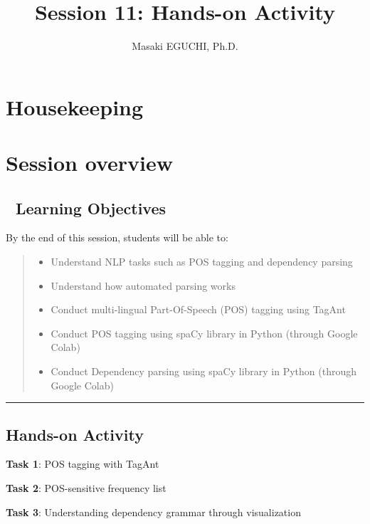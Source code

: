 \documentclass[
  english,
  11pt,
]{article}
\title{Session 11: Hands-on Activity}
\author{Masaki EGUCHI, Ph.D.}
\date{}
\providecommand{\tightlist}{%
  \setlength{\itemsep}{0pt}\setlength{\parskip}{0pt}}
\begin{document}
\maketitle


\section{Housekeeping}\label{housekeeping}

\section{Session overview}\label{session-overview}

\subsection{🎯 Learning Objectives}\label{learning-objectives}

By the end of this session, students will be able to:

\begin{quote}
\begin{itemize}
\tightlist
\item
  Understand NLP tasks such as POS tagging and dependency parsing
\item
  Understand how automated parsing works
\item
  Conduct multi-lingual Part-Of-Speech (POS) tagging using TagAnt
\item
  Conduct POS tagging using spaCy library in Python (through Google
  Colab)
\item
  Conduct Dependency parsing using spaCy library in Python (through
  Google Colab)
\end{itemize}
\end{quote}

\begin{center}\rule{0.5\linewidth}{0.5pt}\end{center}

\subsection{Hands-on Activity}\label{hands-on-activity}

\textbf{Task 1}: POS tagging with TagAnt

\textbf{Task 2}: POS-sensitive frequency list

\textbf{Task 3}: Understanding dependency grammar through visualization
\end{document}
